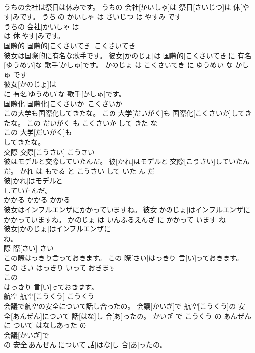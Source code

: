 \documentclass[8pt]{extreport}
\begin{document}
\begin{CJK}{UTF8}{min}
\\	うちの会社は祭日は休みです。	うちの 会社[かいしゃ]は 祭日[さいじつ]は 休[やす]みです。	うち の かいしゃ は さいじつ は やすみ です	
\\	うちの 会社[かいしゃ]は
\\	は 休[やす]みです。			
\\	国際的	国際的[こくさいてき]	こくさいてき	
\\	彼女は国際的に有名な歌手です。	彼女[かのじょ]は 国際的[こくさいてき]に 有名[ゆうめい]な 歌手[かしゅ]です。	かのじょ は こくさいてき に ゆうめい な かしゅ です	
\\	彼女[かのじょ]は
\\	に 有名[ゆうめい]な 歌手[かしゅ]です。			
\\	国際化	国際化[こくさいか]	こくさいか	
\\	この大学も国際化してきたな。	この 大学[だいがく]も 国際化[こくさいか]してきたな。	この だいがく も こくさいか して きた な	
\\	この 大学[だいがく]も
\\	してきたな。			
\\	交際	交際[こうさい]	こうさい	
\\	彼はモデルと交際していたんだ。	彼[かれ]はモデルと 交際[こうさい]していたんだ。	かれ は もでる と こうさい して いた ん だ	
\\	彼[かれ]はモデルと
\\	していたんだ。			
\\	かかる	かかる	かかる	
\\	彼女はインフルエンザにかかっていますね。	彼女[かのじょ]はインフルエンザにかかっていますね。	かのじょ は いんふるえんざ に かかって います ね	
\\	彼女[かのじょ]はインフルエンザに
\\	ね。			
\\	際	際[さい]	さい	
\\	この際はっきり言っておきます。	この 際[さい]はっきり 言[い]っておきます。	この さい はっきり いって おきます	
\\	この
\\	はっきり 言[い]っておきます。			
\\	航空	航空[こうくう]	こうくう	
\\	会議で航空の安全について話し合ったの。	会議[かいぎ]で 航空[こうくう]の 安全[あんぜん]について 話[はな]し 合[あ]ったの。	かいぎ で こうくう の あんぜん に ついて はなしあった の	
\\	会議[かいぎ]で
\\	の 安全[あんぜん]について 話[はな]し 合[あ]ったの。			

\end{CJK}
\end{document}
